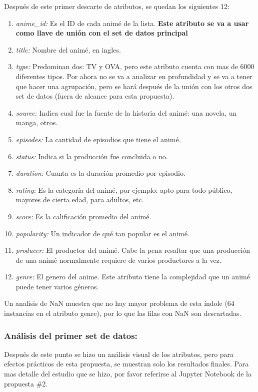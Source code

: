 \documentclass[a4paper]{article}
\begin{document}
Después de este primer descarte de atributos, se quedan los siguientes 12:
\begin{enumerate}
    \item \textit{anime\_id:} Es el ID de cada animé de la lista. \textbf{Este atributo se va a usar como llave de unión con el set de datos principal}
    \item \textit{title:} Nombre del animé, en ingles.
    \item \textit{type:} Predominan dos: TV y OVA, pero este atributo cuenta con mas de 6000 diferentes tipos. Por ahora no se va a analizar en profundidad y se va a tener que hacer una agrupación, pero se hará después de la unión con los otros dos set de datos (fuera de alcance para esta propuesta).
    \item \textit{source:} Indica cual fue la fuente de la historia del animé: una novela, un manga, otros.
    \item \textit{episodes:} La cantidad de episodios que tiene el animé.
    \item \textit{status:} Indica si la producción fue concluida o no.
    \item \textit{duration:} Cuanta es la duración promedio por episodio.
    \item \textit{rating:} Es la categoría del animé, por ejemplo: apto para todo público, mayores de cierta edad, para adultos, etc.
    \item \textit{score:} Es la calificación promedio del animé.
    \item \textit{popularity:} Un indicador de qué tan popular es el animé.
    \item \textit{producer:} El productor del animé. Cabe la pena resaltar que una producción de una animé normalmente requiere de varios productores a la vez.
    \item \textit{genre:} El genero del anime. Este atributo tiene la complejidad que un animé puede tener varios géneros.
\end{enumerate}

Un analisis de NaN muestra que no hay mayor problema de esta índole (64 instancias en el atributo genre), por lo que las filas con NaN son descartadas.

\subsubsection{Análisis del primer set de datos:}
Después de este punto se hizo un análisis visual de los atributos, pero para efectos prácticos de esta propuesta, se muestran solo los resultados finales. Para mas detalle del estudio que se hizo, por favor referirse al Jupyter Notebook de la propuesta \#2.
\end{document}
